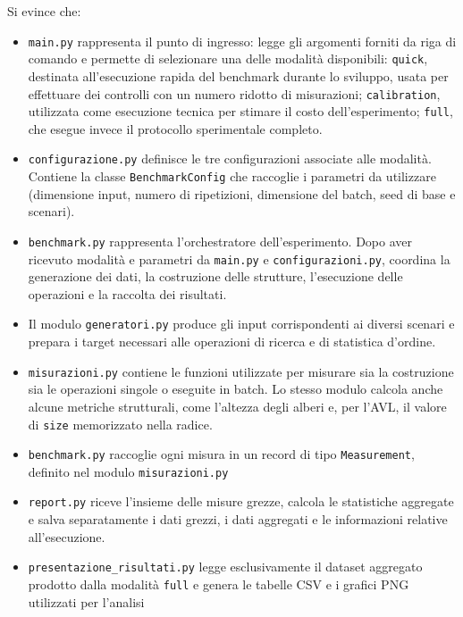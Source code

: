 \documentclass[a4paper,11pt]{article}
\begin{document}
Si evince che: 
\begin{itemize}
    \item \texttt{main.py} rappresenta il punto di ingresso: legge gli argomenti forniti da riga di comando e permette di selezionare una delle modalità disponibili: \texttt{quick}, destinata all'esecuzione rapida del benchmark durante lo sviluppo, usata per effettuare dei controlli con un numero ridotto di misurazioni; \texttt{calibration}, utilizzata come esecuzione tecnica per stimare il costo dell'esperimento; \texttt{full}, che esegue invece il protocollo sperimentale completo.
    
    \item \texttt{configurazione.py} definisce le tre configurazioni associate alle modalità. Contiene la classe \texttt{BenchmarkConfig} che raccoglie i parametri da utilizzare (dimensione input, numero di ripetizioni, dimensione del batch, seed di base e scenari). 
    
    \item \texttt{benchmark.py} rappresenta l'orchestratore dell'esperimento. Dopo aver ricevuto modalità e parametri da \texttt{main.py} e \texttt{configurazioni.py}, coordina la generazione dei dati, la costruzione delle strutture, l'esecuzione delle operazioni e la raccolta dei risultati.
    
    \item Il modulo \texttt{generatori.py} produce gli input corrispondenti ai diversi scenari e prepara i target necessari alle operazioni di ricerca e di statistica d'ordine.
    
    \item \texttt{misurazioni.py} contiene le funzioni utilizzate per misurare sia la costruzione sia le operazioni singole o eseguite in batch. Lo stesso modulo calcola anche alcune metriche strutturali, come l'altezza degli alberi e, per l'AVL, il valore di \texttt{size} memorizzato nella radice.
    
    \item \texttt{benchmark.py} raccoglie ogni misura in un record di tipo \texttt{Measurement}, definito nel modulo \texttt{misurazioni.py}
    
    \item \texttt{report.py} riceve l'insieme delle misure grezze, calcola le statistiche aggregate e salva separatamente i dati grezzi, i dati aggregati e le informazioni relative all'esecuzione. 
    
    \item \texttt{presentazione\_risultati.py} legge esclusivamente il dataset aggregato prodotto dalla modalità \texttt{full} e genera le tabelle CSV e i grafici PNG utilizzati per l'analisi
\end{itemize}
\end{document}
